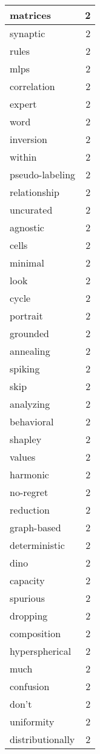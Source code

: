 \begin{table}[h]
\begin{tabular}{|l|r|}
\hline
matrices & 2 \\
\hline
synaptic & 2 \\
\hline
rules & 2 \\
\hline
mlps & 2 \\
\hline
correlation & 2 \\
\hline
expert & 2 \\
\hline
word & 2 \\
\hline
inversion & 2 \\
\hline
within & 2 \\
\hline
pseudo-labeling & 2 \\
\hline
relationship & 2 \\
\hline
uncurated & 2 \\
\hline
agnostic & 2 \\
\hline
cells & 2 \\
\hline
minimal & 2 \\
\hline
look & 2 \\
\hline
cycle & 2 \\
\hline
portrait & 2 \\
\hline
grounded & 2 \\
\hline
annealing & 2 \\
\hline
spiking & 2 \\
\hline
skip & 2 \\
\hline
analyzing & 2 \\
\hline
behavioral & 2 \\
\hline
shapley & 2 \\
\hline
values & 2 \\
\hline
harmonic & 2 \\
\hline
no-regret & 2 \\
\hline
reduction & 2 \\
\hline
graph-based & 2 \\
\hline
deterministic & 2 \\
\hline
dino & 2 \\
\hline
capacity & 2 \\
\hline
spurious & 2 \\
\hline
dropping & 2 \\
\hline
composition & 2 \\
\hline
hyperspherical & 2 \\
\hline
much & 2 \\
\hline
confusion & 2 \\
\hline
don’t & 2 \\
\hline
uniformity & 2 \\
\hline
distributionally & 2 \\

\end{tabular}
\end{table}
